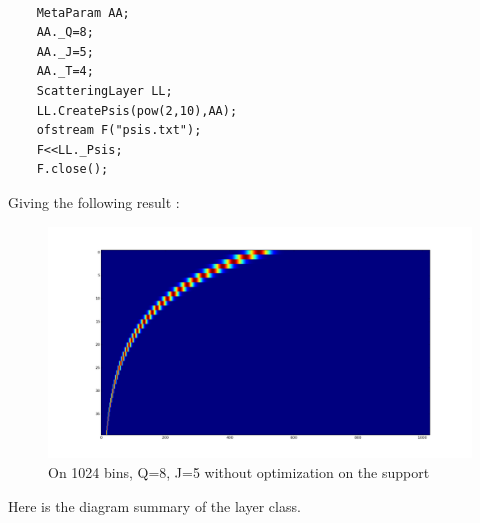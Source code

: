 \documentclass[a4paper]{report}
\begin{document}
\begin{lstlisting}
    
    MetaParam AA;
    AA._Q=8;
    AA._J=5;
    AA._T=4;
    ScatteringLayer LL;
    LL.CreatePsis(pow(2,10),AA);
    ofstream F("psis.txt");
    F<<LL._Psis;
    F.close();

\end{lstlisting}
Giving the following result :
\begin{figure}[H]
\begin{center}
\includegraphics[scale=0.21]{psis.png}\caption{On 1024 bins, Q=8, J=5 without optimization on the support}\label{psis_examples}
\end{center}
\end{figure}
Here is the diagram summary of the layer class.
\end{document}
